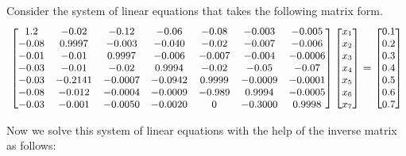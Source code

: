 \begin{example}
Consider the system of linear equations that takes the following matrix form.
\[\small
\begin{bmatrix}
  1.2 & -0.02 & -0.12 & -0.06 & -0.08 & -0.003 & -0.005\\
 -0.08 & 0.9997 & -0.003 & -0.040 & -0.02 & -0.007 & -0.006 \\
 -0.01 & -0.01 & 0.9997 & -0.006 & -0.007 & -0.004 & -0.0006 \\
 -0.03 & -0.01 & -0.02 & 0.9994 & -0.02 & -0.05 & -0.07 \\
 -0.03 & -0.2141 & -0.0007 & -0.0942 & 0.9999 & -0.0009 & -0.0001 \\
 -0.08 & -0.012 & -0.0004 & -0.0009 & -0.989 & 0.9994 & -0.0005 \\
  -0.03 & -0.001 & -0.0050 & -0.0020 & 0 & -0.3000 & 0.9998
\end{bmatrix}
\begin{bmatrix}
    x_1 \\
    x_2 \\
    x_3 \\
    x_4 \\
    x_5 \\
    x_6 \\
    x_7
\end{bmatrix}
=
\begin{bmatrix}
    0.1 \\
    0.2 \\
    0.3 \\
    0.4 \\
    0.5 \\
    0.6 \\
    0.7
\end{bmatrix}
\]

Now we solve this system of linear equations with the help of the inverse matrix as follows:


\end{example}
